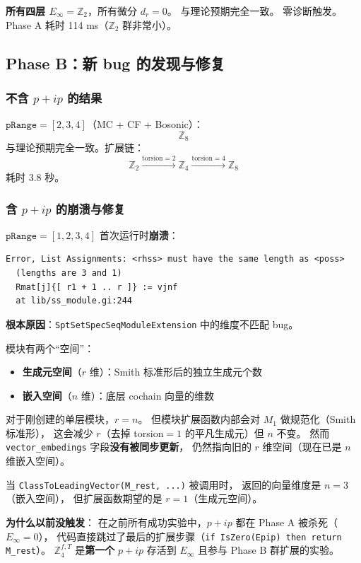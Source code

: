 \documentclass[a4paper,fontset=ubuntu,12pt]{ctexart}
\begin{document}
\textbf{所有四层 $E_\infty = \mathbb{Z}_2$}，所有微分 $d_r = 0$。
与理论预期完全一致。
零诊断触发。Phase A 耗时 114 ms（$\mathbb{Z}_2$ 群非常小）。

\subsection{Phase B：新 bug 的发现与修复}

\subsubsection{不含 $p{+}ip$ 的结果}

$\texttt{pRange} = [2,3,4]$（MC + CF + Bosonic）：
\[
\boxed{\mathbb{Z}_8}
\]
与理论预期完全一致。扩展链：
\[
\mathbb{Z}_2 \xrightarrow{\text{torsion}=2} \mathbb{Z}_4
\xrightarrow{\text{torsion}=4} \mathbb{Z}_8
\]
耗时 3.8 秒。

\subsubsection{含 $p{+}ip$ 的崩溃与修复}

$\texttt{pRange} = [1,2,3,4]$ 首次运行时\textbf{崩溃}：
\begin{verbatim}
Error, List Assignments: <rhss> must have the same length as <poss>
  (lengths are 3 and 1)
  Rmat[j]{[ r1 + 1 .. r ]} := vjnf
  at lib/ss_module.gi:244
\end{verbatim}

\textbf{根本原因}：\texttt{SptSetSpecSeqModuleExtension} 中的维度不匹配 bug。

模块有两个``空间''：
\begin{itemize}
\item \textbf{生成元空间}（$r$ 维）：Smith 标准形后的独立生成元个数
\item \textbf{嵌入空间}（$n$ 维）：底层 cochain 向量的维数
\end{itemize}

对于刚创建的单层模块，$r = n$。
但模块扩展函数内部会对 $M_1$ 做规范化（Smith 标准形），
这会减少 $r$（去掉 torsion$=1$ 的平凡生成元）但 $n$ 不变。
然而 \texttt{vector\_embedings} 字段\textbf{没有被同步更新}，
仍然指向旧的 $r$ 维空间（现在已是 $n$ 维嵌入空间）。

当 \texttt{ClassToLeadingVector(M\_rest, ...)} 被调用时，
返回的向量维度是 $n = 3$（嵌入空间），
但扩展函数期望的是 $r = 1$（生成元空间）。

\textbf{为什么以前没触发}：
在之前所有成功实验中，$p{+}ip$ 都在 Phase A 被杀死（$E_\infty = 0$），
代码直接跳过了最后的扩展步骤（\texttt{if IsZero(Epip) then return M\_rest}）。
$\mathbb{Z}_4^{f,T}$ 是\textbf{第一个} $p{+}ip$ 存活到 $E_\infty$
且参与 Phase B 群扩展的实验。
\end{document}
